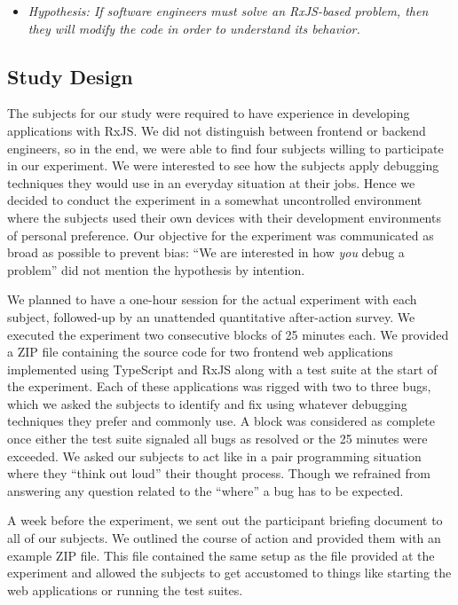 \documentclass[12pt,a4paper]{article}
\begin{document}
\begin{itemize}
	\item \emph{Hypothesis: If software engineers must solve an RxJS-based problem, then they will modify the code in order to understand its behavior.}
\end{itemize}

\subsection{Study Design}

The subjects for our study were required to have experience in developing applications with RxJS. We did not distinguish between frontend or backend engineers, so in the end, we were able to find four subjects willing to participate in our experiment. We were interested to see how the subjects apply debugging techniques they would use in an everyday situation at their jobs. Hence we decided to conduct the experiment in a somewhat uncontrolled environment where the subjects used their own devices with their development environments of personal preference. Our objective for the experiment was communicated as broad as possible to prevent bias: ``We are interested in how \emph{you} debug a problem'' did not mention the hypothesis by intention.

We planned to have a one-hour session for the actual experiment with each subject, followed-up by an unattended quantitative after-action survey. We executed the experiment two consecutive blocks of 25 minutes each. We provided a ZIP file containing the source code for two frontend web applications implemented using TypeScript and RxJS along with a test suite at the start of the experiment. Each of these applications was rigged with two to three bugs, which we asked the subjects to identify and fix using whatever debugging techniques they prefer and commonly use. A block was considered as complete once either the test suite signaled all bugs as resolved or the 25 minutes were exceeded. We asked our subjects to act like in a pair programming situation where they ``think out loud'' their thought process. Though we refrained from answering any question related to the ``where'' a bug has to be expected.

A week before the experiment, we sent out the participant briefing document to all of our subjects. We outlined the course of action and provided them with an example ZIP file. This file contained the same setup as the file provided at the experiment and allowed the subjects to get accustomed to things like starting the web applications or running the test suites.
\end{document}
